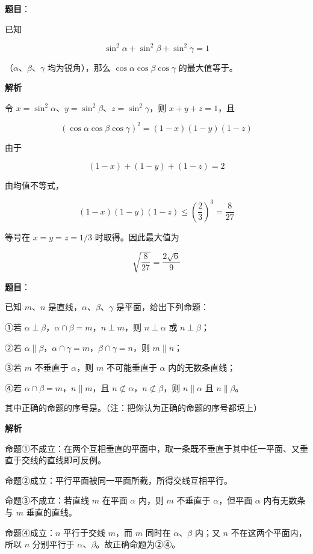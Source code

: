 \begin{answer}

\textbf{题目}：

已知

\nopagebreak[4]
\[
\sin^2\alpha+\sin^2\beta+\sin^2\gamma=1
\]

（$\alpha\text{、}\beta\text{、}\gamma$ 均为锐角），那么 $\cos\alpha\cos\beta\cos\gamma$ 的最大值等于\gkblank{}。

\textbf{解析}

令 $x=\sin^2\alpha$、$y=\sin^2\beta$、$z=\sin^2\gamma$，则 $x+y+z=1$，且

\nopagebreak[4]
\[
(\cos\alpha\cos\beta\cos\gamma)^2=(1-x)(1-y)(1-z)
\]

由于

\nopagebreak[4]
\[
(1-x)+(1-y)+(1-z)=2
\]

由均值不等式，

\nopagebreak[4]
\[
(1-x)(1-y)(1-z)\le\left(\frac23\right)^3=\frac8{27}
\]

等号在 $x=y=z=1/3$ 时取得。因此最大值为

\nopagebreak[4]
\[
\sqrt{\frac8{27}}=\frac{2\sqrt6}{9}
\]


\end{answer}
\begin{answer}

\textbf{题目}：

已知 $m\text{、}n$ 是直线，$\alpha\text{、}\beta\text{、}\gamma$ 是平面，给出下列命题：

①若 $\alpha\perp\beta$，$\alpha\cap\beta=m$，$n\perp m$，则 $n\perp\alpha$ 或 $n\perp\beta$；

②若 $\alpha\parallel\beta$，$\alpha\cap\gamma=m$，$\beta\cap\gamma=n$，则 $m\parallel n$；

③若 $m$ 不垂直于 $\alpha$，则 $m$ 不可能垂直于 $\alpha$ 内的无数条直线；

④若 $\alpha\cap\beta=m$，$n\parallel m$，且 $n\not\subset\alpha$，$n\not\subset\beta$，则 $n\parallel\alpha$ 且 $n\parallel\beta$。

其中正确的命题的序号是\gkblank{}。（注：把你认为正确的命题的序号都填上）

\textbf{解析}

命题①不成立：在两个互相垂直的平面中，取一条既不垂直于其中任一平面、又垂直于交线的直线即可反例。

命题②成立：平行平面被同一平面所截，所得交线互相平行。

命题③不成立：若直线 $m$ 在平面 $\alpha$ 内，则 $m$ 不垂直于 $\alpha$，但平面 $\alpha$ 内有无数条与 $m$ 垂直的直线。

命题④成立：$n$ 平行于交线 $m$，而 $m$ 同时在 $\alpha\text{、}\beta$ 内；又 $n$ 不在这两个平面内，所以 $n$ 分别平行于 $\alpha\text{、}\beta$。故正确命题为②④。


\end{answer}

